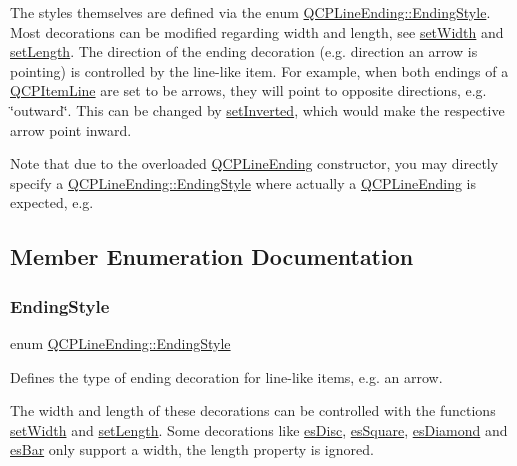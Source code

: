The styles themselves are defined via the enum \mbox{\hyperlink{class_q_c_p_line_ending_a5ef16e6876b4b74959c7261d8d4c2cd5}{Q\+C\+P\+Line\+Ending\+::\+Ending\+Style}}. Most decorations can be modified regarding width and length, see \mbox{\hyperlink{class_q_c_p_line_ending_a26dc020ea985a72cc25881ce2115e34e}{set\+Width}} and \mbox{\hyperlink{class_q_c_p_line_ending_ae36fa01763751cd64b7f56c3507e935a}{set\+Length}}. The direction of the ending decoration (e.\+g. direction an arrow is pointing) is controlled by the line-\/like item. For example, when both endings of a \mbox{\hyperlink{class_q_c_p_item_line}{Q\+C\+P\+Item\+Line}} are set to be arrows, they will point to opposite directions, e.\+g. \char`\"{}outward\char`\"{}. This can be changed by \mbox{\hyperlink{class_q_c_p_line_ending_a580e4e2360b35ebb8d68f3494aa2335d}{set\+Inverted}}, which would make the respective arrow point inward.

Note that due to the overloaded \mbox{\hyperlink{class_q_c_p_line_ending}{Q\+C\+P\+Line\+Ending}} constructor, you may directly specify a \mbox{\hyperlink{class_q_c_p_line_ending_a5ef16e6876b4b74959c7261d8d4c2cd5}{Q\+C\+P\+Line\+Ending\+::\+Ending\+Style}} where actually a \mbox{\hyperlink{class_q_c_p_line_ending}{Q\+C\+P\+Line\+Ending}} is expected, e.\+g. 
\begin{DoxyCodeInclude}{0}
\end{DoxyCodeInclude}


\subsection{Member Enumeration Documentation}
\mbox{\label{class_q_c_p_line_ending_a5ef16e6876b4b74959c7261d8d4c2cd5}} 
\subsubsection{\texorpdfstring{EndingStyle}{EndingStyle}}
{\footnotesize\ttfamily enum \mbox{\hyperlink{class_q_c_p_line_ending_a5ef16e6876b4b74959c7261d8d4c2cd5}{Q\+C\+P\+Line\+Ending\+::\+Ending\+Style}}}

Defines the type of ending decoration for line-\/like items, e.\+g. an arrow.



The width and length of these decorations can be controlled with the functions \mbox{\hyperlink{class_q_c_p_line_ending_a26dc020ea985a72cc25881ce2115e34e}{set\+Width}} and \mbox{\hyperlink{class_q_c_p_line_ending_ae36fa01763751cd64b7f56c3507e935a}{set\+Length}}. Some decorations like \mbox{\hyperlink{class_q_c_p_line_ending_a5ef16e6876b4b74959c7261d8d4c2cd5ae5a3414916817258bcc6dddd605e8f5c}{es\+Disc}}, \mbox{\hyperlink{class_q_c_p_line_ending_a5ef16e6876b4b74959c7261d8d4c2cd5ae1836502fa43d8990bb62b2d493a140a}{es\+Square}}, \mbox{\hyperlink{class_q_c_p_line_ending_a5ef16e6876b4b74959c7261d8d4c2cd5a378fe5a8b768411b0bc1765210fe7200}{es\+Diamond}} and \mbox{\hyperlink{class_q_c_p_line_ending_a5ef16e6876b4b74959c7261d8d4c2cd5a2cf543bbca332df26d89bf779f50469f}{es\+Bar}} only support a width, the length property is ignored.


